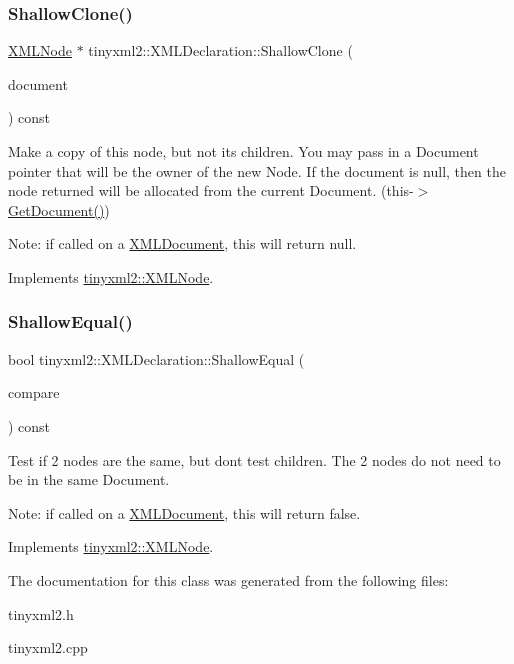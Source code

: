 \subsubsection{\texorpdfstring{ShallowClone()}{ShallowClone()}}
{\footnotesize\ttfamily \mbox{\hyperlink{classtinyxml2_1_1_x_m_l_node}{X\+M\+L\+Node}} $\ast$ tinyxml2\+::\+X\+M\+L\+Declaration\+::\+Shallow\+Clone (\begin{DoxyParamCaption}\item[{\mbox{\hyperlink{classtinyxml2_1_1_x_m_l_document}{X\+M\+L\+Document}} $\ast$}]{document }\end{DoxyParamCaption}) const\hspace{0.3cm}{\ttfamily [virtual]}}

Make a copy of this node, but not its children. You may pass in a Document pointer that will be the owner of the new Node. If the \textquotesingle{}document\textquotesingle{} is null, then the node returned will be allocated from the current Document. (this-\/$>$\mbox{\hyperlink{classtinyxml2_1_1_x_m_l_node_af343d1ef0b45c0020e62d784d7e67a68}{Get\+Document()}})

Note\+: if called on a \mbox{\hyperlink{classtinyxml2_1_1_x_m_l_document}{X\+M\+L\+Document}}, this will return null. 

Implements \mbox{\hyperlink{classtinyxml2_1_1_x_m_l_node_a8402cbd3129d20e9e6024bbcc0531283}{tinyxml2\+::\+X\+M\+L\+Node}}.

\mbox{\label{classtinyxml2_1_1_x_m_l_declaration_ae8b4d3a399857029f36c322b0801b69c}} 
\subsubsection{\texorpdfstring{ShallowEqual()}{ShallowEqual()}}
{\footnotesize\ttfamily bool tinyxml2\+::\+X\+M\+L\+Declaration\+::\+Shallow\+Equal (\begin{DoxyParamCaption}\item[{const \mbox{\hyperlink{classtinyxml2_1_1_x_m_l_node}{X\+M\+L\+Node}} $\ast$}]{compare }\end{DoxyParamCaption}) const\hspace{0.3cm}{\ttfamily [virtual]}}

Test if 2 nodes are the same, but don\textquotesingle{}t test children. The 2 nodes do not need to be in the same Document.

Note\+: if called on a \mbox{\hyperlink{classtinyxml2_1_1_x_m_l_document}{X\+M\+L\+Document}}, this will return false. 

Implements \mbox{\hyperlink{classtinyxml2_1_1_x_m_l_node_a7ce18b751c3ea09eac292dca264f9226}{tinyxml2\+::\+X\+M\+L\+Node}}.



The documentation for this class was generated from the following files\+:\begin{DoxyCompactItemize}
\item 
tinyxml2.\+h\item 
tinyxml2.\+cpp\end{DoxyCompactItemize}
